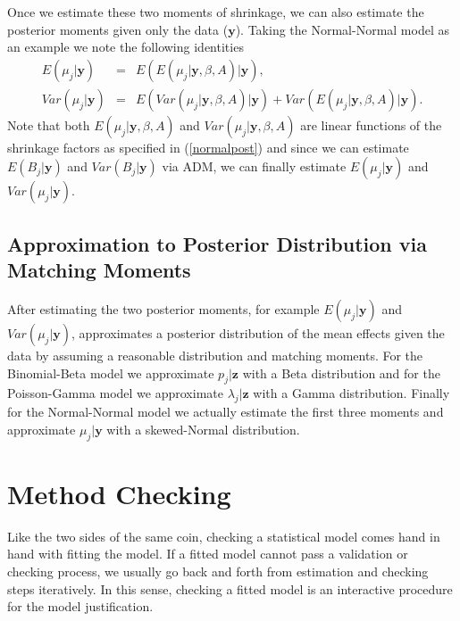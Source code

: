 \documentclass[article]{jss}
\begin{document}
Once we estimate these two moments of shrinkage, we can also estimate the posterior moments given only the data ($\textbf{y}$). Taking the Normal-Normal model as an example we note the following identities
\begin{eqnarray}
E(\mu_{j}\vert \textbf{y}) & = & E(E(\mu_{j}\vert \textbf{y}, \beta, A)\vert \textbf{y}), \\
Var(\mu_{j}\vert \textbf{y}) & = & E(Var(\mu_{j}\vert \textbf{y}, \beta, A)\vert \textbf{y})+Var(E(\mu_{j}\vert \textbf{y}, \beta, A)\vert \textbf{y}).
\end{eqnarray}  
Note that both $E(\mu_{j}\vert \textbf{y}, \beta, A)$ and $Var(\mu_{j}\vert \textbf{y}, \beta, A)$ are linear functions of the shrinkage factors as specified in (\ref{normalpost}) and since we can estimate $E(B_{j}\vert\textbf{y})$ and $Var(B_{j}\vert\textbf{y})$ via ADM, we can finally estimate $E(\mu_{j}\vert \textbf{y})$ and $Var(\mu_{j}\vert \textbf{y})$.

\subsection[Approximation to Posterior Distribution by Moment Matching]{Approximation to Posterior Distribution via Matching Moments}
After estimating the two posterior moments, for example $E(\mu_{j}\vert \textbf{y})$ and $Var(\mu_{j}\vert \textbf{y})$,  approximates a posterior distribution of the mean effects given the data by assuming a reasonable distribution and matching moments. For the Binomial-Beta model we approximate $p_{j}\vert \textbf{z}$ with a Beta distribution and for the Poisson-Gamma model we approximate $\lambda_{j}\vert \textbf{z}$ with a Gamma distribution. Finally for the Normal-Normal model we actually estimate the first three moments and approximate $\mu_{j}\vert \textbf{y}$ with a skewed-Normal distribution. 



\section[Method Checking]{Method Checking}
Like the two sides of the same coin, checking a statistical model comes hand in hand with fitting the model. If a fitted model cannot pass a validation or checking process, we usually go back and forth from estimation and checking steps iteratively. In this sense, checking a fitted model is an interactive procedure for the model justification.
\end{document}
